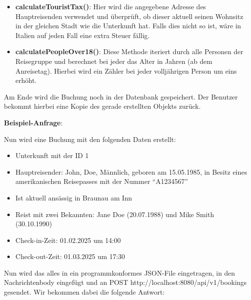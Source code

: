	\begin{itemize}
		\item \textbf{calculateTouristTax()}: Hier wird die angegebene Adresse des Hauptreisenden verwendet und überprüft, ob dieser aktuell seinen Wohnsitz in der gleichen Stadt wie die Unterkunft hat. Falls dies nicht so ist, wäre in Italien auf jeden Fall eine extra Steuer fällig.
		\item \textbf{calculatePeopleOver18()}: Diese Methode iteriert durch alle Personen der Reisegruppe und berechnet bei jeder das Alter in Jahren (ab dem Anreisetag). Hierbei wird ein Zähler bei jeder volljährigen Person um eins erhöht.
	\end{itemize}
	
	
	Am Ende wird die Buchung noch in der Datenbank gespeichert. Der Benutzer bekommt hierbei eine Kopie des gerade erstellten Objekts zurück.
	
	\textbf{Beispiel-Anfrage}: 
	
	Nun wird eine Buchung mit den folgenden Daten erstellt:
	
	\begin{itemize}
		\item Unterkunft mit der ID 1
		\item Hauptreisender: John, Doe, Männlich, geboren am 15.05.1985, in Besitz eines amerikanischen Reisepasses mit der Nummer \enquote{A1234567}
		\item Ist aktuell ansässig in Braunau am Inn
		\item Reist mit zwei Bekannten: Jane Doe (20.07.1988) und Mike Smith (30.10.1990)
		\item Check-in-Zeit: 01.02.2025 um 14:00
		\item Check-out-Zeit: 01.03.2025 um 17:30
	\end{itemize}
	
	Nun wird das alles in ein programmkonformes JSON-File eingetragen, in den Nachrichtenbody eingefügt und an \texttt{}{POST http://localhost:8080/api/v1/bookings} gesendet. Wir bekommen dabei die folgende Antwort:
	
